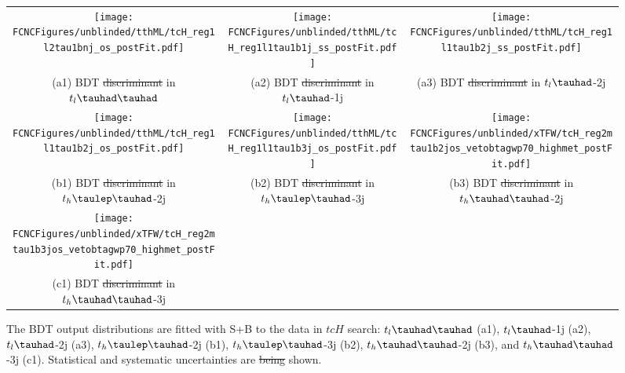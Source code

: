 \documentclass[PAPER, coverpage, atlasdraft=true, texlive=2016, UKenglish]{\ATLASLATEXPATH atlasdoc}
\providecommand{\DIFdel}[1]{{\protect\color{red}\sout{#1}}}                      %
\providecommand{\DIFdelFL}[1]{\DIFdel{#1}} %
\providecommand{\DIFdelbeginFL}{} %
\providecommand{\DIFdelendFL}{} %
\begin{document}
\begin{figure}[H]
\begin{tabular}{@{}ccc@{}}
\texttt{[image: \\FCNCFigures/unblinded/tthML/tcH\_reg1l2tau1bnj\_os\_postFit.pdf]}&
\texttt{[image: \\FCNCFigures/unblinded/tthML/tcH\_reg1l1tau1b1j\_ss\_postFit.pdf]}&
\texttt{[image: \\FCNCFigures/unblinded/tthML/tcH\_reg1l1tau1b2j\_ss\_postFit.pdf]}\\
(a1) BDT \DIFdelbeginFL \DIFdelFL{discriminant }\DIFdelendFL in $t_l\thadhad$ & (a2) BDT \DIFdelbeginFL \DIFdelFL{discriminant }\DIFdelendFL in  $t_l\tauhad$-1j& (a3) BDT \DIFdelbeginFL \DIFdelFL{discriminant }\DIFdelendFL in $t_l\tauhad$-2j\\
\texttt{[image: \\FCNCFigures/unblinded/tthML/tcH\_reg1l1tau1b2j\_os\_postFit.pdf]}&
\texttt{[image: \\FCNCFigures/unblinded/tthML/tcH\_reg1l1tau1b3j\_os\_postFit.pdf]}&
\texttt{[image: \\FCNCFigures/unblinded/xTFW/tcH\_reg2mtau1b2jos\_vetobtagwp70\_highmet\_postFit.pdf]}\\
(b1) BDT \DIFdelbeginFL \DIFdelFL{discriminant }\DIFdelendFL in $t_h\tlhad$-2j & (b2) BDT \DIFdelbeginFL \DIFdelFL{discriminant }\DIFdelendFL in  $t_h\tlhad$-3j & (b3) BDT \DIFdelbeginFL \DIFdelFL{discriminant }\DIFdelendFL in $t_h\thadhad$-2j \\
\texttt{[image: \\FCNCFigures/unblinded/xTFW/tcH\_reg2mtau1b3jos\_vetobtagwp70\_highmet\_postFit.pdf]}& \\
(c1) BDT \DIFdelbeginFL \DIFdelFL{discriminant }\DIFdelendFL in$t_h\thadhad$-3j\\
\end{tabular}
\caption{ The BDT output distributions are fitted with S+B to the data in $tcH$ search: $t_l\thadhad$ (a1),  $t_l\tauhad$-1j (a2),  $t_l\tauhad$-2j (a3),
  $t_h\tlhad$-2j (b1), $t_h\tlhad$-3j (b2), $t_h\thadhad$-2j (b3), and $t_h\thadhad$-3j (c1). Statistical and systematic uncertainties are \DIFdelbeginFL \DIFdelFL{being }\DIFdelendFL shown.}
\label{fig:asimov_postfitbdtHc}
\end{figure}
\end{document}
